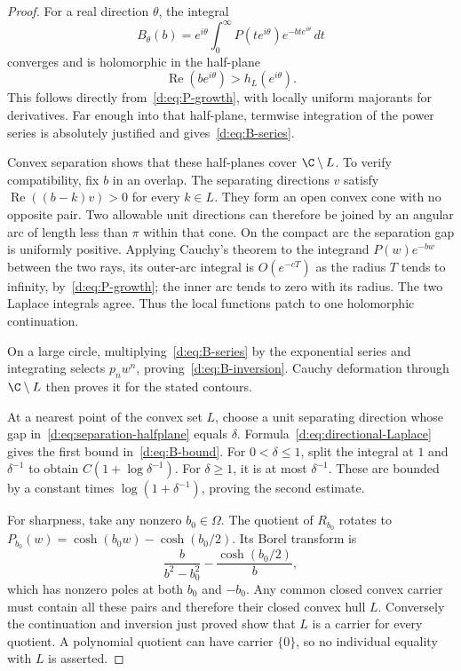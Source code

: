 \documentclass[11pt,a4paper]{article}
\numberwithin{equation}{section}
\theoremstyle{definition}\newtheorem{definition}[theorem]{Definition}
\theoremstyle{remark}\newtheorem{remark}[theorem]{Remark}
\begin{document}
\begin{proof}
For a real direction $\theta$, the integral
\begin{equation}\label{d:eq:directional-Laplace}
 B_\theta(b)=e^{i\theta}\int_0^\infty
     P(te^{i\theta})e^{-bte^{i\theta}}\,dt
\end{equation}
converges and is holomorphic in the half-plane
\begin{equation}\label{d:eq:separation-halfplane}
 \operatorname{Re}(be^{i\theta})>h_L(e^{i\theta}).
\end{equation}
This follows directly from~\eqref{d:eq:P-growth}, with locally uniform majorants for derivatives. Far enough into that half-plane, termwise integration of the power series is absolutely justified and gives~\eqref{d:eq:B-series}.

Convex separation shows that these half-planes cover $\C\setminus L$. To verify compatibility, fix $b$ in an overlap. The separating directions $v$ satisfy
$\operatorname{Re}((b-k)v)>0$ for every $k\in L$. They form an open convex cone with no opposite pair. Two allowable unit directions can therefore be joined by an angular arc of length less than $\pi$ within that cone. On the compact arc the separation gap is uniformly positive. Applying Cauchy's theorem to the integrand $P(w)e^{-bw}$ between the two rays, its outer-arc integral is $O(e^{-cT})$ as the radius $T$ tends to infinity, by~\eqref{d:eq:P-growth}; the inner arc tends to zero with its radius. The two Laplace integrals agree. Thus the local functions patch to one holomorphic continuation.

On a large circle, multiplying~\eqref{d:eq:B-series} by the exponential series and integrating selects $p_nw^n$, proving~\eqref{d:eq:B-inversion}. Cauchy deformation through $\C\setminus L$ then proves it for the stated contours.

At a nearest point of the convex set $L$, choose a unit separating direction whose gap in~\eqref{d:eq:separation-halfplane} equals $\delta$. Formula~\eqref{d:eq:directional-Laplace} gives the first bound in~\eqref{d:eq:B-bound}. For $0<\delta\le1$, split the integral at $1$ and $\delta^{-1}$ to obtain $C(1+\log\delta^{-1})$. For $\delta\ge1$, it is at most $\delta^{-1}$. These are bounded by a constant times $\log(1+\delta^{-1})$, proving the second estimate.

For sharpness, take any nonzero $b_0\in\Omega$. The quotient of $R_{b_0}$ rotates to
$P_{b_0}(w)=\cosh(b_0w)-\cosh(b_0/2)$. Its Borel transform is
\[
 \frac{b}{b^2-b_0^2}-\frac{\cosh(b_0/2)}b,
\]
which has nonzero poles at both $b_0$ and $-b_0$. Any common closed convex carrier must contain all these pairs and therefore their closed convex hull $L$. Conversely the continuation and inversion just proved show that $L$ is a carrier for every quotient. A polynomial quotient can have carrier $\{0\}$, so no individual equality with $L$ is asserted.
\end{proof}
\end{document}
